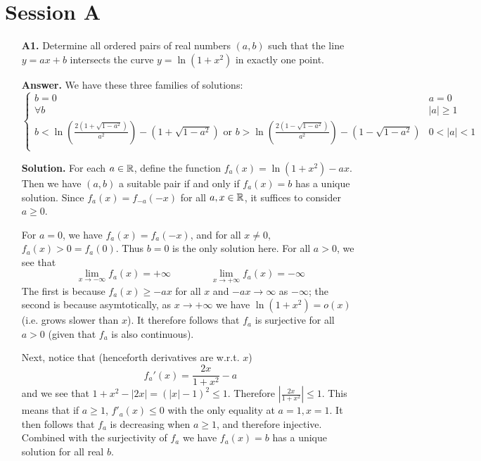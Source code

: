 \documentclass[11pt,a4paper]{article}
\begin{document}
	\section*{Session A}
	\begin{enumerate}
		\item [\textbf{A1.}]
		Determine all ordered pairs of real numbers $(a,b)$ such that the line $y=ax+b$ intersects the curve $y=\ln(1+x^2)$ in exactly one point.
		
		\textbf{Answer.} 
		We have these three families of solutions: 
		\begin{equation}
			\begin{cases}
				b = 0 & a=0\\
				\forall b & |a|\ge 1\\
				b < \ln(\frac{2(1 + \sqrt{1-a^2})}{a^2}) - (1 + \sqrt{1-a^2})
				\text{ or }
				b > 
				\ln(\frac{2(1 - \sqrt{1-a^2})}{a^2}) - (1 - \sqrt{1-a^2})
				& 0 < |a| < 1\\
			\end{cases}
		\end{equation}
		
		\textbf{Solution.}
		For each $a\in{\mathbb R}$, 
		define the function $f_a(x) = \ln(1 + x^2) - ax$. 
		Then we have $(a, b)$ a suitable pair if and only if $f_a(x) = b$ has a unique solution. 
		Since $f_a(x)=f_{-a}(-x)$ for all $a, x\in{\mathbb R}$, it suffices to consider $a\ge 0$. 
		
		For $a=0$, we have $f_a(x)=f_a(-x)$, 
		and for all $x \neq 0$, $f_a(x) > 0 =  f_a(0)$. Thus $b=0$ is the only solution here. 
		For all $a > 0$, we see that 
		\begin{equation}
			\lim_{x\to-\infty} f_a(x)=+\infty\qquad 
			\qquad 
			\lim_{x\to+\infty} f_a(x)=-\infty
		\end{equation}
	    The first is because $f_a(x)\ge -ax$ for all $x$ and $-ax\to\infty$ 
	    as $-\infty$; 
	    the second is because asymtotically, 
	    as $x\to+\infty$ we have $\ln(1+x^2)=o(x)$ (i.e. grows slower than $x$). 
		It therefore follows that $f_a$ is surjective for all $a > 0$ (given that $f_a$ is also continuous). 
		
		Next, notice that (henceforth derivatives are w.r.t. $x$)
		\begin{equation}
			f_a'(x) = \frac{2x}{1 + x^2} - a
		\end{equation}
	    and we see that $1+x^2-|2x| = (|x|-1)^2\le 1$. Therefore $|\frac{2x}{1 + x^2}|\le 1$. 
	    This means that if $a\ge 1$, $f'_a(x)\le 0$ with the only equality at $a=1, x=1$. 
	    It then follows that $f_a$ is decreasing when $a\ge 1$, and therefore injective. 
	    Combined with the surjectivity of $f_a$ we have $f_a(x)=b$ has a unique solution for all real $b$. 
	    

\end{enumerate}
\end{document}
